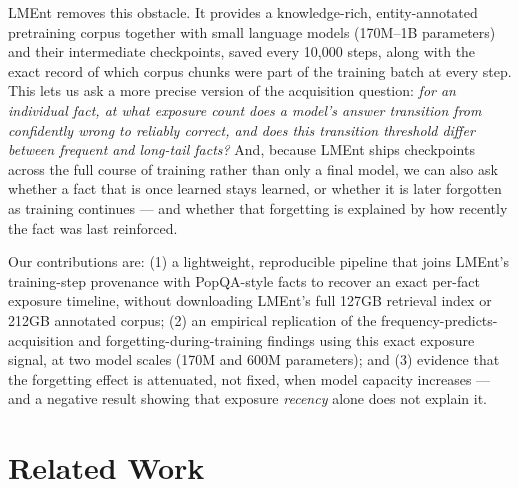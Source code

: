 \documentclass[11pt]{article}
\begin{document}
LMEnt \citep{gottesman2025lment} removes this obstacle. It provides a knowledge-rich, entity-annotated pretraining corpus together with small language models (170M--1B parameters) and their intermediate checkpoints, saved every 10{,}000 steps, along with the exact record of which corpus chunks were part of the training batch at every step. This lets us ask a more precise version of the acquisition question: \emph{for an individual fact, at what exposure count does a model's answer transition from confidently wrong to reliably correct, and does this transition threshold differ between frequent and long-tail facts?} And, because LMEnt ships checkpoints across the full course of training rather than only a final model, we can also ask whether a fact that is once learned stays learned, or whether it is later forgotten as training continues --- and whether that forgetting is explained by how recently the fact was last reinforced.

Our contributions are: (1) a lightweight, reproducible pipeline that joins LMEnt's training-step provenance with PopQA-style facts \citep{mallen2023whennot} to recover an exact per-fact exposure timeline, without downloading LMEnt's full 127GB retrieval index or 212GB annotated corpus; (2) an empirical replication of the frequency-predicts-acquisition and forgetting-during-training findings using this exact exposure signal, at two model scales (170M and 600M parameters); and (3) evidence that the forgetting effect is attenuated, not fixed, when model capacity increases --- and a negative result showing that exposure \emph{recency} alone does not explain it.

\section{Related Work}
\end{document}

